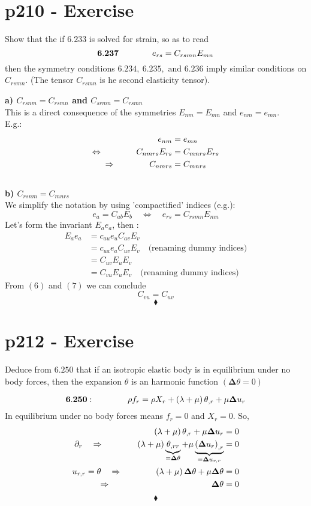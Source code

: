 \section{p210 - Exercise}
\begin{tcolorbox}
Show that the if $\mathbf{6.233}$ is solved for strain, so as to read
$$\mathbf{6.237} \quad\quad\quad\quad e_{rs}= C_{rsmn}E_{mn}$$
then the symmetry conditions $\mathbf{6.234}, \  \mathbf{6.235}, \text{ and } \mathbf{6.236} $ imply similar conditions on $C_{rsmn}$. (The tensor $C_{rsmn}$ is he second elasticity tensor).
\end{tcolorbox}
\textbf{a) $C_{rsnm}= C_{rsmn}$ and $C_{srmn}= C_{rsmn}$\\}
This is a direct consequence of the symmetries $E_{nm}= E_{mn}$ and $e_{nm}= e_{mn}$. \\E.g.:
\begin{align}
e_{nm}&= e_{mn}\\
\Leftrightarrow\quad\quad\quad\quad C_{nmrs}E_{rs}&=C_{mnrs}E_{rs}\\
\Rightarrow\quad\quad\quad\quad C_{nmrs}&=C_{mnrs}
\end{align}\\
\textbf{b) $C_{rsnm}= C_{mnrs}$ \\}
We simplify the notation by using 'compactified' indices (e.g.):
$$e_{a}= C_{ab}E_{b} \quad \Leftrightarrow \quad e_{rs}= C_{rsmn}E_{mn}$$
Let's form the invariant $E_ae_a$, then :
\begin{align}
E_ae_a &=  c_{au}e_{u}C_{av}E_{v}\\
&=  c_{ua}e_{a}C_{uv}E_{v}\quad\text{(renaming dummy indices)}\\
&=  C_{uv}E_u E_{v}\\
&=  C_{vu}E_u E_{v}\quad\text{(renaming dummy indices)}
\end{align}
From $(6)$ and $(7)$ we can conclude 
$$C_{vu}=C_{uv}$$
 $$\blacklozenge$$
\newpage

\section{p212 - Exercise}
\begin{tcolorbox}
Deduce from  $\mathbf{6.250}$ that if an isotropic elastic body is in equilibrium under no body forces, then the expansion $\theta$ is an harmonic function $\left(\mathbf{\Delta}\theta = 0\right)$
\end{tcolorbox}
$$\mathbf{6.250}: \quad\quad\quad\quad \rho f_r= \rho X_r+\left(\lambda+ \mu\right)\theta_{,r}+\mu\mathbf{\Delta}u_r$$
In equilibrium under no body forces means $f_r=0$ and $X_r=0$. So,
\begin{align}
\left(\lambda+ \mu\right)\theta_{,r}+\mu\mathbf{\Delta}u_r&=0\\
\partial_r \quad \Rightarrow \quad\quad\quad\quad \left( \lambda+ \mu \right)\underbrace{\theta_{,rr}}_{= \mathbf{\Delta}\theta} +\mu\underbrace{\left(\mathbf{\Delta}u_r \right)_{,r}}_{=\mathbf{\Delta}u_{r,r}} &=0\\
u_{r,r}=\theta\quad\Rightarrow\quad\quad\quad\quad \left( \lambda+ \mu \right)\mathbf{\Delta}\theta +\mu\mathbf{\Delta}\theta &=0\\
\Rightarrow\quad\quad\quad\quad\quad\quad\quad\quad\quad\quad\quad\quad \mathbf{\Delta}\theta &=0
\end{align}
 $$\blacklozenge$$
\newpage


